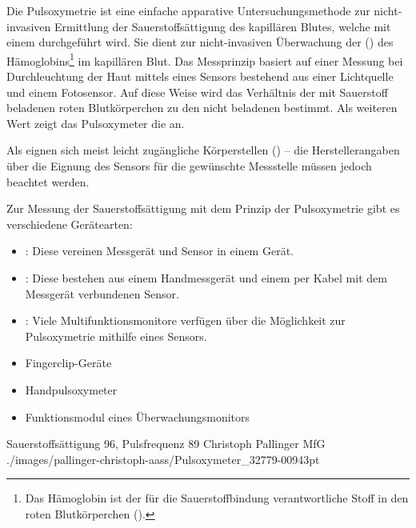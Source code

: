 \Text{\TxBeschreibung}
{%
Die Pulsoxymetrie ist eine einfache apparative
Untersuchungsmethode zur nicht-invasiven Ermittlung der
Sauerstoffsättigung des kapillären Blutes, welche mit einem
 durchgeführt wird. Sie dient zur
nicht-invasiven Überwachung der 
() des Hämoglobins\footnote{Das Hämoglobin ist
der für die Sauerstoffbindung verantwortliche Stoff in den
roten Blutkörperchen ().} im
kapillären Blut. Das Messprinzip basiert auf einer Messung
 bei
Durchleuchtung der Haut mittels eines Sensors bestehend aus
einer Lichtquelle und einem Fotosensor. Auf diese Weise wird
das Verhältnis der mit Sauerstoff beladenen roten
Blutkörperchen zu den nicht beladenen bestimmt.
Als weiteren Wert zeigt das Pulsoxymeter die
 an.

Als  eignen sich meist leicht zugängliche
Körperstellen () -- die
Herstellerangaben über die Eignung des Sensors für die
gewünschte Messstelle müssen jedoch beachtet werden.
\cite{LoefflerBiochemie7,ArbeitstechnikenAZ1,Soehnke200607}

}{}{}{}{}
{%
Zur Messung der Sauerstoffsättigung mit dem Prinzip der
Pulsoxymetrie gibt es verschiedene Gerätearten:

\begin{itemize}
  \item {}: Diese vereinen Messgerät und
  Sensor in einem Gerät.
  \item {}: Diese bestehen aus einem
  Handmessgerät und einem per Kabel mit dem Messgerät verbundenen Sensor.
  \item {}:
  Viele Multifunktionsmonitore verfügen über die Möglichkeit zur Pulsoxymetrie
  mithilfe eines Sensors.
\end{itemize}

}{
\begin{itemize}
  \item Fingerclip-Geräte
  \item Handpulsoxymeter
  \item Funktionsmodul eines Überwachungsmonitors
\end{itemize}
}{}{}{}

{Sauerstoffsättigung 96\PC*, Pulsfrequenz 89\PerMin*}%
{}%
{Christoph Pallinger}%
{MfG}%
{./images/pallinger-christoph-aass/Pulsoxymeter_32779-00943pt}%
{}%

